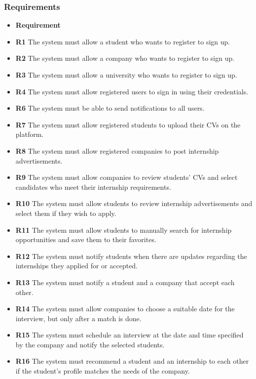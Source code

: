 \documentclass[a4paper,12pt]{article}
\begin{document}
\subsubsection{Requirements}
    \begin{itemize}
        \item \textbf{Requirement} 
        \item \textbf{R1} The system must allow a student who wants to register to sign up.
        \item \textbf{R2} The system must allow a company who wants to register to sign up.
        \item \textbf{R3} The system must allow a university who wants to register to sign up.
        \item \textbf{R4} The system must allow registered users to sign in using their credentials.
        \item \textbf{R6} The system must be able to send notifications to all users.
        \item \textbf{R7} The system must allow registered students to upload their CVs on the platform.
        \item \textbf{R8} The system must allow registered companies to post internship advertisements.
        \item \textbf{R9} The system must allow companies to review students' CVs and select candidates who meet their internship requirements.
        \item \textbf{R10} The system must allow students to review internship advertisements and select them if they wish to apply.
         \item \textbf{R11} The system must allow students to manually search for internship opportunities and save them to their favorites.
         \item \textbf{R12} The system must notify students when there are updates regarding the internships they applied for or accepted.
        \item \textbf{R13} The system must notify a student and a company that accept each other.
        \item \textbf{R14} The system must allow companies to choose a suitable date for the interview, but only after a match is done.
        \item \textbf{R15} The system must schedule an interview at the date and time specified by the company and notify the selected students.
        \item \textbf{R16} The system must recommend a student and an internship to each other if the student's profile matches the needs of the company. 

\end{itemize}
\end{document}
